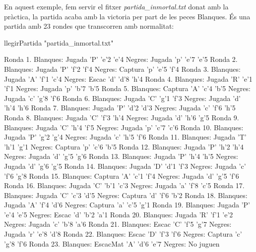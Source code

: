 \documentclass{article}
\begin{document}
En aquest exemple, fem servir el fitxer \textit{partida\_inmortal.txt} donat amb la pràctica, la partida acaba amb la victoria per part de les peces Blanques. És una partida amb 23 rondes que transcorren amb normalitat:\\
\begin{tcolorbox}
llegirPartida "partida\_inmortal.txt"
\end{tcolorbox}
\begin{tcolorbox}
Ronda 1.
Blanques: Jugada 'P' 'e'2 'e'4
Negres:   Jugada 'p' 'e'7 'e'5
Ronda 2.
Blanques: Jugada 'P' 'f'2 'f'4
Negres:   Captura 'p' 'e'5 'f'4
Ronda 3.
Blanques: Jugada 'A' 'f'1 'c'4
Negres:   Escac 'd' 'd'8 'h'4
Ronda 4.
Blanques: Jugada 'R' 'e'1 'f'1
Negres:   Jugada 'p' 'b'7 'b'5
Ronda 5.
Blanques: Captura 'A' 'c'4 'b'5
Negres:   Jugada 'c' 'g'8 'f'6
Ronda 6.
Blanques: Jugada 'C' 'g'1 'f'3
Negres:   Jugada 'd' 'h'4 'h'6
Ronda 7.
Blanques: Jugada 'P' 'd'2 'd'3
Negres:   Jugada 'c' 'f'6 'h'5
Ronda 8.
Blanques: Jugada 'C' 'f'3 'h'4
Negres:   Jugada 'd' 'h'6 'g'5
Ronda 9.
Blanques: Jugada 'C' 'h'4 'f'5
Negres:   Jugada 'p' 'c'7 'c'6
Ronda 10.
Blanques: Jugada 'P' 'g'2 'g'4
Negres:   Jugada 'c' 'h'5 'f'6
Ronda 11.
Blanques: Jugada 'T' 'h'1 'g'1
Negres:   Captura 'p' 'c'6 'b'5
Ronda 12.
Blanques: Jugada 'P' 'h'2 'h'4
Negres:   Jugada 'd' 'g'5 'g'6
Ronda 13.
Blanques: Jugada 'P' 'h'4 'h'5
Negres:   Jugada 'd' 'g'6 'g'5
Ronda 14.
Blanques: Jugada 'D' 'd'1 'f'3
Negres:   Jugada 'c' 'f'6 'g'8
Ronda 15.
Blanques: Captura 'A' 'c'1 'f'4
Negres:   Jugada 'd' 'g'5 'f'6
Ronda 16.
Blanques: Jugada 'C' 'b'1 'c'3
Negres:   Jugada 'a' 'f'8 'c'5
Ronda 17.
Blanques: Jugada 'C' 'c'3 'd'5
Negres:   Captura 'd' 'f'6 'b'2
Ronda 18.
Blanques: Jugada 'A' 'f'4 'd'6
Negres:   Captura 'a' 'c'5 'g'1
Ronda 19.
Blanques: Jugada 'P' 'e'4 'e'5
Negres:   Escac 'd' 'b'2 'a'1
Ronda 20.
Blanques: Jugada 'R' 'f'1 'e'2
Negres:   Jugada 'c' 'b'8 'a'6
Ronda 21.
Blanques: Escac 'C' 'f'5 'g'7
Negres:   Jugada 'r' 'e'8 'd'8
Ronda 22.
Blanques: Escac 'D' 'f'3 'f'6
Negres:   Captura 'c' 'g'8 'f'6
Ronda 23.
Blanques: EscacMat 'A' 'd'6 'e'7
Negres:  No juguen
\end{tcolorbox}
\end{document}
